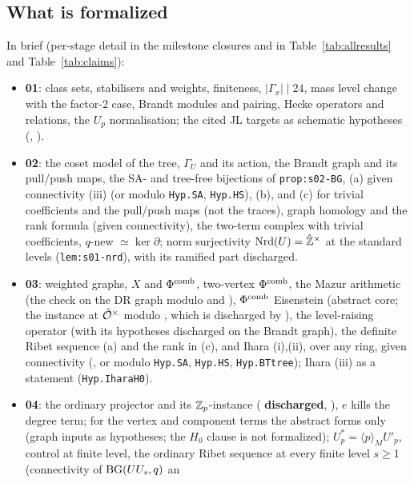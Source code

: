 \subsection{What is formalized}
In brief (per-stage detail in the milestone closures and in Table~\ref{tab:allresults} and Table~\ref{tab:claims}):
\begin{itemize}
\item \textbf{01}: class sets, stabilisers and weights, finiteness, $|\Gamma_x|\mid 24$, mass level change with the factor-2
  case, Brandt modules and pairing, Hecke operators and relations, the $U_p$ normalisation; the cited JL targets as
  schematic hypotheses (, ).
\item \textbf{02}: the coset model of the tree, $\Gamma_U$ and its action, the Brandt graph and its pull/push maps, the
  SA- and tree-free bijections of \texttt{prop:s02-BG}, (a) given connectivity (iii) (or modulo
  \texttt{Hyp.SA}, \texttt{Hyp.HS}), (b), and (c) for trivial coefficients and the pull/push maps (not the traces), graph
  homology and the rank formula (given connectivity),
  the two-term complex with trivial coefficients, $q$-new $\simeq\ker\partial$; norm surjectivity $\mathrm{Nrd}(U)=\hat{\mathbb{Z}}^\times$ at the
  standard levels (\texttt{lem:s01-nrd}), with its ramified part  discharged.
\item \textbf{03}: weighted graphs, $X$ and $\Phi^{\mathrm{comb}}$, two-vertex $\Phi^{\mathrm{comb}}$, the Mazur arithmetic (the check on the DR graph modulo  and ),
  $\Phi^{\mathrm{comb}}$ Eisenstein (abstract core; the instance at $\hat{\mathcal{O}}^\times$ modulo , which is discharged by \BSFdischargeName),
  the level-raising operator (with its hypotheses discharged on the Brandt graph), the definite Ribet sequence (a) and
  the rank in (c), and Ihara (i),(ii), over any ring, given connectivity (, or modulo \texttt{Hyp.SA},
  \texttt{Hyp.HS}, \texttt{Hyp.BTtree}); Ihara (iii) as a statement (\texttt{Hyp.IharaH0}).
\item \textbf{04}: the ordinary projector and its $\mathbb{Z}_p$-instance ( \textbf{discharged},
  ), $e$ kills the degree term; for the vertex and component terms the abstract forms only (graph inputs as hypotheses; the
  $H_0$ clause is not formalized); $U_p^*=\langle p\rangle_M U'_p$,
  control at finite level, the ordinary Ribet sequence at every finite level $s\ge1$ (connectivity of $\mathrm{BG}(UU_s,q)$ an

\end{itemize}
